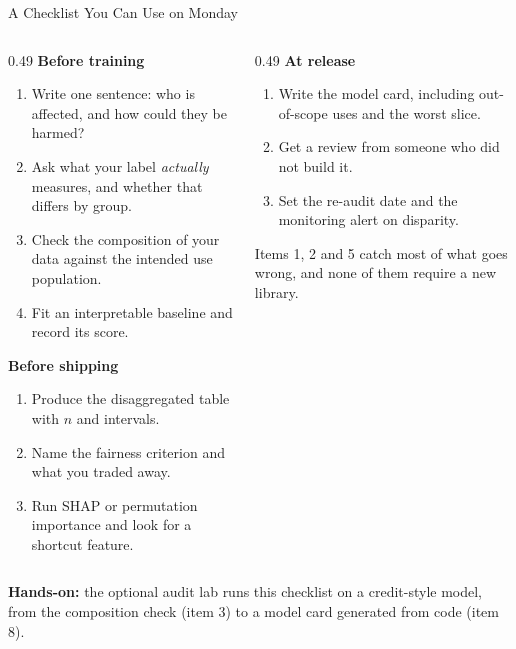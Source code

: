 \begin{frame}{A Checklist You Can Use on Monday}

    \begin{columns}[T]
        \begin{column}{0.49\textwidth}
            \textbf{Before training}
            \begin{enumerate}\scriptsize
                \setlength\itemsep{0.28em}
                \item Write one sentence: who is affected, and how could they be harmed?
                \item Ask what your label \emph{actually} measures, and whether that differs by
                      group.
                \item Check the composition of your data against the intended use population.
                \item Fit an interpretable baseline and record its score.
            \end{enumerate}

            \vspace{0.6em}
            \textbf{Before shipping}
            \begin{enumerate}\scriptsize
                \setlength\itemsep{0.28em}
                \setcounter{enumi}{4}
                \item Produce the disaggregated table with $n$ and intervals.
                \item Name the fairness criterion and what you traded away.
                \item Run SHAP or permutation importance and look for a shortcut feature.
            \end{enumerate}
        \end{column}
        \begin{column}{0.49\textwidth}
            \textbf{At release}
            \begin{enumerate}\scriptsize
                \setlength\itemsep{0.28em}
                \setcounter{enumi}{7}
                \item Write the model card, including out-of-scope uses and the worst slice.
                \item Get a review from someone who did not build it.
                \item Set the re-audit date and the monitoring alert on disparity.
            \end{enumerate}

            \vspace{1.0em}
            \begin{tcolorbox}[colback=raiGreen!5, colframe=raiGreen!60, boxrule=0.7pt]
                \scriptsize
                Items 1, 2 and 5 catch most of what goes wrong, and none of them require a new
                library.
            \end{tcolorbox}
        \end{column}
    \end{columns}

    \vspace{0.8em}
    \centering
    \scriptsize \textbf{Hands-on:} the optional audit lab runs this checklist on a credit-style model, from the composition
    check (item 3) to a model card generated from code (item 8).
\end{frame}
